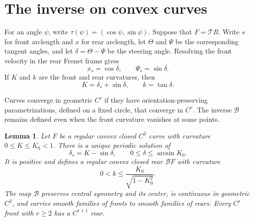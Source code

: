 \documentclass[11pt]{article}
\numberwithin{equation}{section}
\newtheorem{lemma}[theorem]{Lemma}
\newcommand{\Tmap}{\mathcal T}
\newcommand{\Bmap}{\mathcal B}
\begin{document}
\section{The inverse on convex curves}\label{sec:inverse}

For an angle \(\psi\), write \(\tau(\psi)=(\cos\psi,\sin\psi)\). Suppose that
\(F=\Tmap R\). Write \(s\) for front arclength and \(x\) for rear arclength,
let \(\Theta\) and \(\Psi\) be the corresponding tangent angles, and let
\(\delta=\Theta-\Psi\) be the steering angle. Resolving the front velocity in
the rear Frenet frame gives
\[
  x_s=\cos\delta,\qquad \Psi_s=\sin\delta.
\]
If \(K\) and \(k\) are the front and rear curvatures, then
\[
  K=\delta_s+\sin\delta,\qquad k=\tan\delta.
\]

Curves converge in geometric \(C^r\) if they have orientation-preserving
parametrizations, defined on a fixed circle, that converge in \(C^r\). The
inverse \(\Bmap\) remains defined even when the front curvature vanishes at
some points.

\begin{lemma}\label{lem:inverse}
Let \(F\) be a regular convex closed \(C^2\) curve with curvature
\(0\leq K\leq K_0<1\). There is a unique periodic solution of
\[
  \delta_s=K-\sin\delta,\qquad 0\leq\delta\leq\arcsin K_0.
\]
It is positive and defines a regular convex closed rear
\(\Bmap F\) with curvature
\[
  0<k\leq\frac{K_0}{\sqrt{1-K_0^2}}.
\]
The map \(\Bmap\) preserves central symmetry and its center, is continuous in
geometric \(C^2\), and carries smooth families of fronts to smooth families of
rears. Every \(C^r\) front with \(r\geq2\) has a \(C^{r+1}\) rear.
\end{lemma}
\end{document}
